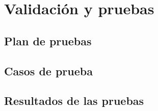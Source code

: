 \chapter{Validación y pruebas}
\label{ch:validation}


\section{Plan de pruebas}

\section{Casos de prueba}

\section{Resultados de las pruebas}
